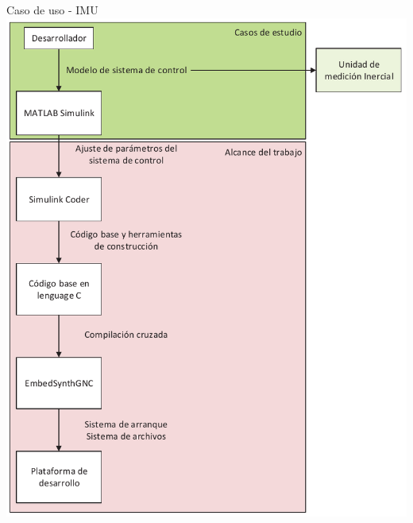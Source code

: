 \documentclass[10pt,aspectratio=169]{beamer} %
\begin{document}
\begin{frame}{Caso de uso - IMU}
  \centering
  \includegraphics[scale=0.4]{Diagrama_general_del_proyecto/dgp_ce_3.pdf}
\end{frame}
\end{document}
